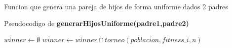 Funcion que genera una pareja de hijos de forma uniforme dados 2 padres

Pseudocodigo de \textbf{generarHijosUniforme(padre1,padre2)}
\begin{algorithm}[H]
  \begin{algorithmic}[1]
      \State $winner \gets \emptyset $
          \State $winner \gets winner \cap torneo(poblacion,fitness\_i,n)$
      \EndFor
      \State {}
    \EndFunction
  \end{algorithmic}
\end{algorithm}



